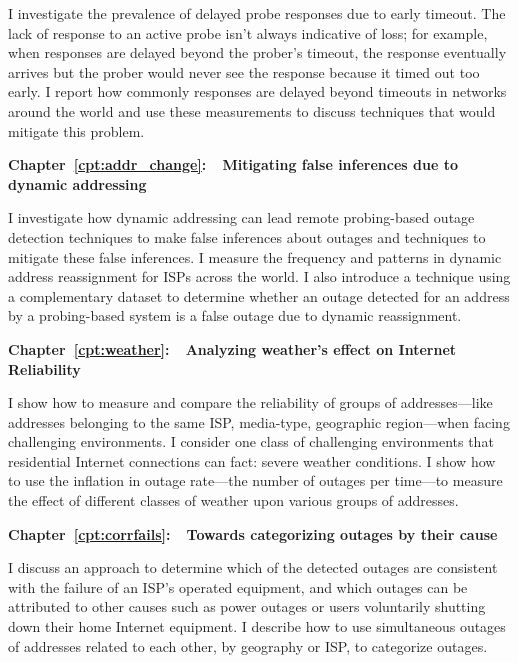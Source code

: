 I investigate the
prevalence of delayed probe responses due to early timeout. The lack
of response to an active probe isn't always indicative of loss; for
example, when responses are delayed beyond the prober's timeout, the
response eventually arrives but the prober would never see the
response because it timed out too early. I report how commonly
responses are delayed beyond timeouts in networks around the world and
use these measurements to discuss techniques that would mitigate this problem.

\textbf{Chapter~\ref{cpt:addr_change}:~~Mitigating false inferences due to dynamic addressing} 

I investigate how dynamic addressing can lead remote probing-based
outage detection techniques to make false inferences about outages and
techniques to mitigate these false inferences. I measure the frequency
and patterns in dynamic address reassignment for ISPs across the
world.  I also introduce a technique using a complementary dataset to
determine whether an outage detected for an address by a probing-based
system is a false outage due to dynamic reassignment.

\textbf{Chapter~\ref{cpt:weather}:~~Analyzing weather's effect on
  Internet Reliability} 

I show how to measure and compare the reliability of groups of addresses---like
addresses belonging to the same ISP, media-type, geographic
region---when facing challenging environments. I consider one class of
challenging environments that residential Internet connections can
fact: severe weather conditions. I show how to use the inflation in
outage rate---the number of outages per time---to measure the effect
of different classes of weather upon various groups of addresses.

\textbf{Chapter~\ref{cpt:corrfails}:~~Towards categorizing outages by
  their cause} 

I discuss an approach to determine which of the detected outages are
consistent with the failure of an ISP's operated equipment, and which
outages can be attributed to other causes such as power outages or
users voluntarily shutting down their home Internet equipment. I
describe how to use simultaneous outages of addresses related
to each other, by geography or ISP, to categorize outages.


